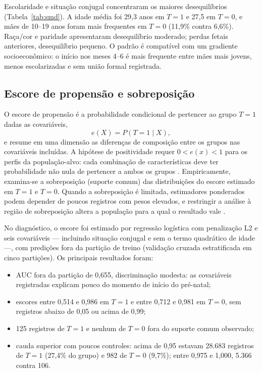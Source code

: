 \documentclass[11pt,a4paper]{article}
\begin{document}
Escolaridade e situação conjugal concentraram os maiores desequilíbrios
(Tabela~\ref{tab:smd}). A idade média foi 29,3 anos em $T=1$ e 27,5 em $T=0$, e mães de
10--19 anos foram mais frequentes em $T=0$ (11,9\% contra 6,6\%). Raça/cor e paridade
apresentaram desequilíbrio moderado; perdas fetais anteriores, desequilíbrio pequeno. O
padrão é compatível com um gradiente socioeconômico: o início nos meses 4--6 é mais
frequente entre mães mais jovens, menos escolarizadas e sem união formal registrada.

\subsection{Escore de propensão e sobreposição}\label{sec:overlap}

O escore de propensão é a probabilidade condicional de pertencer ao grupo $T=1$ dadas as
covariáveis,
\begin{equation}\label{eq:ps}
e(X) = P(T = 1 \mid X),
\end{equation}
e resume em uma dimensão as diferenças de composição entre os grupos nas covariáveis
incluídas. A hipótese de positividade requer $0 < e(x) < 1$ para os perfis da
população-alvo: cada combinação de características deve ter probabilidade não nula de
pertencer a ambos os grupos \cite{petersen2012}. Empiricamente, examina-se a sobreposição
(suporte comum) das distribuições do escore estimado em $T=1$ e $T=0$. Quando a
sobreposição é limitada, estimadores ponderados podem depender de poucos registros com
pesos elevados, e restringir a análise à região de sobreposição altera a população para a
qual o resultado vale \cite{crump2009,petersen2012}.

No diagnóstico, o escore foi estimado por regressão logística com penalização L2 e seis
covariáveis --- incluindo situação conjugal e sem o termo quadrático de idade ---, com
predições fora da partição de treino (validação cruzada estratificada em cinco partições).
Os principais resultados foram:
\begin{itemize}
\item AUC fora da partição de 0,655, discriminação modesta: as covariáveis registradas
explicam pouco do momento de início do pré-natal;
\item escores entre 0,514 e 0,986 em $T=1$ e entre 0,712 e 0,981 em $T=0$, sem registros
abaixo de 0,05 ou acima de 0,99;
\item 125 registros de $T=1$ e nenhum de $T=0$ fora do suporte comum observado;
\item cauda superior com poucos controles: acima de 0,95 estavam 28.683 registros de $T=1$
(27,4\% do grupo) e 982 de $T=0$ (9,7\%); entre 0,975 e 1,000, 5.366 contra 106.
\end{itemize}
\end{document}
